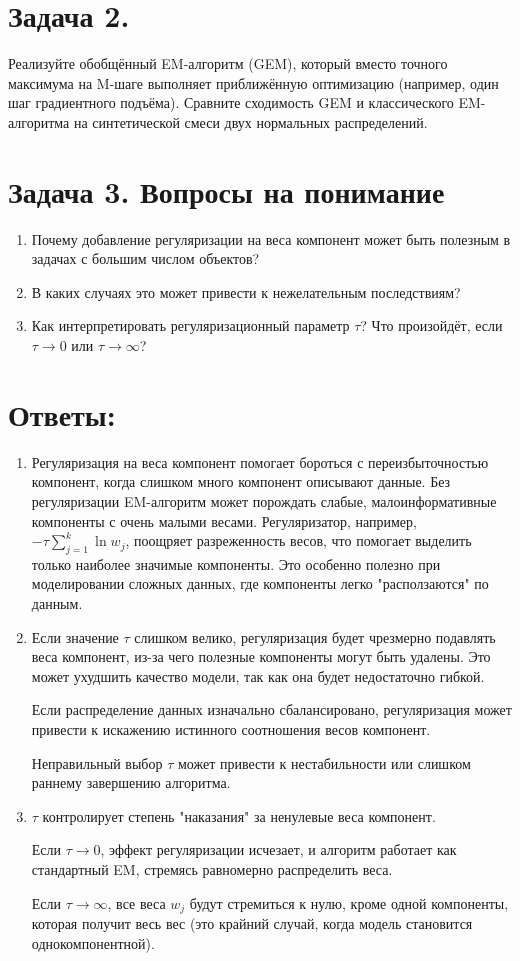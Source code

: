 \section*{\textbf{Задача 2.}} Реализуйте обобщённый EM-алгоритм (GEM), который вместо точного максимума на M-шаге выполняет приближённую оптимизацию (например, один шаг градиентного подъёма). Сравните сходимость GEM и классического EM-алгоритма на синтетической смеси двух нормальных распределений.

\section*{\textbf{Задача 3.} Вопросы на понимание}
\begin{enumerate}
    \item Почему добавление регуляризации на веса компонент может быть полезным в задачах с большим числом объектов?
    \item В каких случаях это может привести к нежелательным последствиям?
    \item Как интерпретировать регуляризационный параметр $\tau$? Что произойдёт, если $\tau \to 0$ или $\tau \to \infty$?
\end{enumerate}

\section*{\textbf{Ответы:}}
\begin{enumerate}
    \item Регуляризация на веса компонент помогает бороться с переизбыточностью компонент, когда слишком много компонент описывают данные. Без регуляризации EM-алгоритм может порождать слабые, малоинформативные компоненты с очень малыми весами. Регуляризатор, например, $-\tau \sum\limits_{j=1}^k \ln w_j$, поощряет разреженность весов, что помогает выделить только наиболее значимые компоненты. Это особенно полезно при моделировании сложных данных, где компоненты легко "расползаются" по данным.
    \item Если значение $\tau$ слишком велико, регуляризация будет чрезмерно подавлять веса компонент, из-за чего полезные компоненты могут быть удалены. Это может ухудшить качество модели, так как она будет недостаточно гибкой.

          Если распределение данных изначально сбалансировано, регуляризация может привести к искажению истинного соотношения весов компонент.

          Неправильный выбор $\tau$ может привести к нестабильности или слишком раннему завершению алгоритма.
    \item $\tau$ контролирует степень "наказания" за ненулевые веса компонент.

          Если $\tau \to 0$, эффект регуляризации исчезает, и алгоритм работает как стандартный EM, стремясь равномерно распределить веса.

          Если $\tau \to \infty$, все веса $w_j$ будут стремиться к нулю, кроме одной компоненты, которая получит весь вес (это крайний случай, когда модель становится однокомпонентной).
\end{enumerate}

